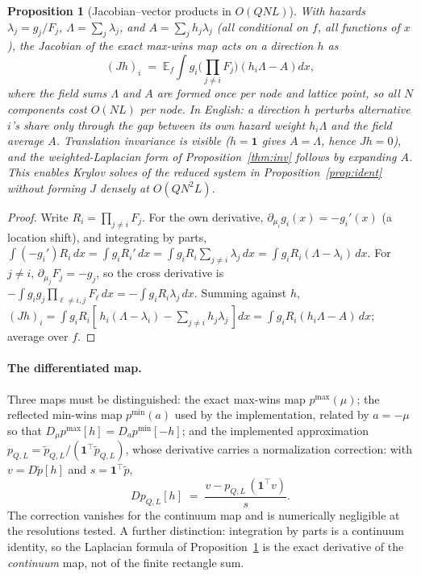\documentclass[12pt]{article}
\newtheorem{proposition}{Proposition}
\theoremstyle{remark}
\newcommand{\E}{\mathbb{E}}
\begin{document}
\begin{proposition}[Jacobian--vector products in $O(QNL)$]\label{prop:jvp}
With hazards $\lambda_j = g_j / F_j$, $\Lambda = \sum_j \lambda_j$, and
$A = \sum_j h_j \lambda_j$ (all conditional on $f$, all functions of $x$),
the Jacobian of the exact max-wins map acts on a direction $h$ as
\[
(Jh)_i \;=\; \E_f \int g_i \Big(\prod_{j \ne i} F_j\Big)
\left( h_i \Lambda - A \right) dx ,
\]
where the field sums $\Lambda$ and $A$ are formed once per node and lattice
point, so all $N$ components cost $O(NL)$ per node. In English: a direction
$h$ perturbs alternative $i$'s share only through the gap between its own
hazard weight $h_i \Lambda$ and the field average $A$. Translation
invariance is visible ($h = \mathbf{1}$ gives $A = \Lambda$, hence $Jh =
0$), and the weighted-Laplacian form of Proposition~\ref{thm:inv} follows by
expanding $A$.
This enables Krylov solves of the reduced system in
Proposition~\ref{prop:ident} without forming $J$ densely at $O(QN^2L)$.
\end{proposition}
\begin{proof}
Write $R_i = \prod_{j \ne i} F_j$. For the own derivative,
$\partial_{\mu_i} g_i(x) = -g_i'(x)$ (a location shift), and integrating by
parts, $\int (-g_i') R_i\,dx = \int g_i R_i' \,dx = \int g_i R_i
\sum_{j \ne i} \lambda_j\,dx = \int g_i R_i (\Lambda -
\lambda_i)\,dx$. For $j \ne i$, $\partial_{\mu_j} F_j = -g_j$, so the
cross derivative is $-\int g_i g_j \prod_{\ell \ne i,j} F_\ell\,dx =
-\int g_i R_i \lambda_j\,dx$. Summing against $h$,
$(Jh)_i = \int g_i R_i [\,h_i(\Lambda - \lambda_i) - \sum_{j \ne i}
h_j \lambda_j\,]dx = \int g_i R_i (h_i \Lambda - A)\,dx$; average over
$f$.
\end{proof}

\paragraph{The differentiated map.} Three maps must be
distinguished: the exact max-wins map $p^{\max}(\mu)$; the reflected
min-wins map $p^{\min}(a)$ used by the implementation, related by $a = -\mu$
so that $D_\mu p^{\max}[h] = D_a p^{\min}[-h]$; and the implemented
approximation $p_{Q,L} = \tilde p_{Q,L} / (\mathbf{1}^\top \tilde
p_{Q,L})$, whose derivative carries a normalization correction: with $v =
D\tilde p[h]$ and $s = \mathbf{1}^\top \tilde p$,
\[
D p_{Q,L}[h] \;=\; \frac{v - p_{Q,L}\, (\mathbf{1}^\top v)}{s}.
\]
The correction vanishes for the continuum map and is numerically
negligible at the resolutions tested. A further distinction: integration by parts is a continuum identity, so the Laplacian
formula of Proposition~\ref{prop:jvp} is the exact derivative of the
\emph{continuum} map, not of the finite rectangle sum.
\end{document}
